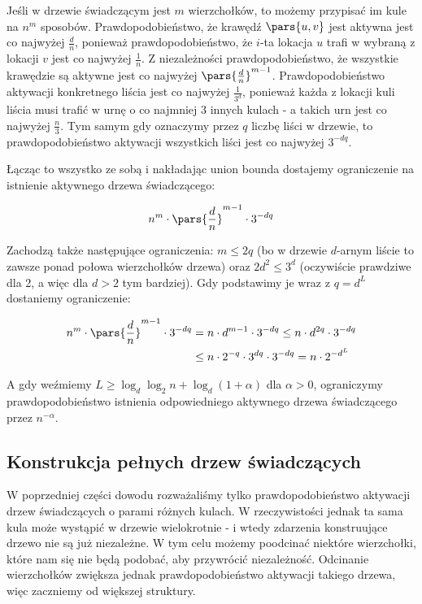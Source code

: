 Jeśli w drzewie świadczącym jest \(m\) wierzchołków, to możemy przypisać im kule na \(n^m\) sposobów.
Prawdopodobieństwo, że krawędź \(\pars{u,v}\) jest aktywna jest co najwyżej \(\frac{d}{n}\), ponieważ prawdopodobieństwo, że \(i\)-ta lokacja \(u\) trafi w wybraną z lokacji \(v\) jest co najwyżej \(\frac{1}{n}\).
Z niezależności prawdopodobieństwo, że wszystkie krawędzie są aktywne jest co najwyżej \(\pars{\frac{d}{n}}^{m-1}\).
Prawdopodobieństwo aktywacji konkretnego liścia jest co najwyżej \(\frac{1}{3^d}\), ponieważ każda z lokacji kuli liścia musi trafić w urnę o co najmniej \(3\) innych kulach - a takich urn jest co najwyżej \(\frac{n}{3}\).
Tym samym gdy oznaczymy przez \(q\) liczbę liści w drzewie, to prawdopodobieństwo aktywacji wszystkich liści jest co najwyżej \(3^{-dq}\).

Łącząc to wszystko ze sobą i nakładając union bounda dostajemy ograniczenie na istnienie aktywnego drzewa świadczącego:

\[
	n^m \cdot \pars{\frac{d}{n}}^{m-1} \cdot 3^{-dq}
\]

Zachodzą także następujące ograniczenia: \(m \leq 2q\) (bo w drzewie \(d\)-arnym liście to zawsze ponad połowa wierzchołków drzewa) oraz \(2d^2 \leq 3^d\) (oczywiście prawdziwe dla 2, a więc dla \(d > 2\) tym bardziej). Gdy podstawimy je wraz z \(q = d^L\) dostaniemy ograniczenie:

\begin{align*}
	n^m \cdot \pars{\frac{d}{n}}^{m-1} \cdot 3^{-dq} & = n \cdot d^{m-1} \cdot 3^{-dq} \leq n \cdot d^{2q} \cdot 3^{-dq} \\
	                                                 & \leq n \cdot 2^{-q} \cdot 3^{dq} \cdot 3^{-dq} = n \cdot 2^{-d^L}
\end{align*}

A gdy weźmiemy \(L \geq \log_d \log_2 n + \log_d(1 + \alpha)\) dla \(\alpha > 0\), ograniczymy prawdopodobieństwo istnienia odpowiedniego aktywnego drzewa świadczącego przez \(n^{-\alpha}\).

\subsection*{Konstrukcja pełnych drzew świadczących}

W poprzedniej części dowodu rozważaliśmy tylko prawdopodobieństwo aktywacji drzew świadczących o parami różnych kulach.
W rzeczywistości jednak ta sama kula może wystąpić w drzewie wielokrotnie - i wtedy zdarzenia konstruujące drzewo nie są już niezależne.
W tym celu możemy poodcinać niektóre wierzchołki, które nam się nie będą podobać, aby przywrócić niezależność.
Odcinanie wierzchołków zwiększa jednak prawdopodobieństwo aktywacji takiego drzewa, więc zaczniemy od większej struktury.

